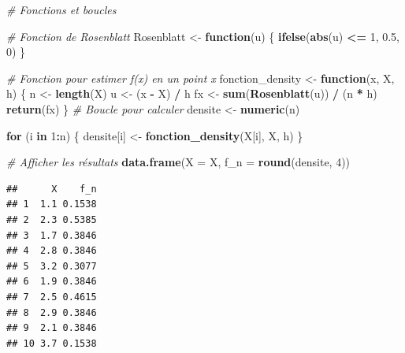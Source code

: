 \documentclass[
  12pt,
]{article}
\newenvironment{Shaded}{\begin{snugshade}}{\end{snugshade}}
\newcommand{\AttributeTok}[1]{\textcolor[rgb]{0.13,0.29,0.53}{#1}}
\newcommand{\CommentTok}[1]{\textcolor[rgb]{0.56,0.35,0.01}{\textit{#1}}}
\newcommand{\ControlFlowTok}[1]{\textcolor[rgb]{0.13,0.29,0.53}{\textbf{#1}}}
\newcommand{\DecValTok}[1]{\textcolor[rgb]{0.00,0.00,0.81}{#1}}
\newcommand{\FloatTok}[1]{\textcolor[rgb]{0.00,0.00,0.81}{#1}}
\newcommand{\FunctionTok}[1]{\textcolor[rgb]{0.13,0.29,0.53}{\textbf{#1}}}
\newcommand{\NormalTok}[1]{#1}
\newcommand{\OtherTok}[1]{\textcolor[rgb]{0.56,0.35,0.01}{#1}}
\newcommand{\SpecialCharTok}[1]{\textcolor[rgb]{0.81,0.36,0.00}{\textbf{#1}}}
\begin{document}
\begin{Shaded}
\begin{Highlighting}[]
\CommentTok{\# Fonctions et boucles}

\CommentTok{\# Fonction de Rosenblatt}
\NormalTok{Rosenblatt }\OtherTok{\textless{}{-}} \ControlFlowTok{function}\NormalTok{(u) \{}
  \FunctionTok{ifelse}\NormalTok{(}\FunctionTok{abs}\NormalTok{(u) }\SpecialCharTok{\textless{}=} \DecValTok{1}\NormalTok{, }\FloatTok{0.5}\NormalTok{, }\DecValTok{0}\NormalTok{)}
\NormalTok{\}}

\CommentTok{\# Fonction pour estimer f(x) en un point x}
\NormalTok{fonction\_density }\OtherTok{\textless{}{-}} \ControlFlowTok{function}\NormalTok{(x, X, h) \{}
\NormalTok{  n }\OtherTok{\textless{}{-}} \FunctionTok{length}\NormalTok{(X)}
\NormalTok{  u }\OtherTok{\textless{}{-}}\NormalTok{ (x }\SpecialCharTok{{-}}\NormalTok{ X) }\SpecialCharTok{/}\NormalTok{ h}
\NormalTok{  fx }\OtherTok{\textless{}{-}} \FunctionTok{sum}\NormalTok{(}\FunctionTok{Rosenblatt}\NormalTok{(u)) }\SpecialCharTok{/}\NormalTok{ (n }\SpecialCharTok{*}\NormalTok{ h)}
  \FunctionTok{return}\NormalTok{(fx)}
\NormalTok{\}}
\CommentTok{\# Boucle pour calculer }
\NormalTok{densite }\OtherTok{\textless{}{-}} \FunctionTok{numeric}\NormalTok{(n)  }

\ControlFlowTok{for}\NormalTok{ (i }\ControlFlowTok{in} \DecValTok{1}\SpecialCharTok{:}\NormalTok{n) \{}
\NormalTok{  densite[i] }\OtherTok{\textless{}{-}} \FunctionTok{fonction\_density}\NormalTok{(X[i], X, h)}
\NormalTok{\}}
\end{Highlighting}
\end{Shaded}

\begin{Shaded}
\begin{Highlighting}[]
\CommentTok{\# Afficher les résultats}
\FunctionTok{data.frame}\NormalTok{(}\AttributeTok{X =}\NormalTok{ X, }\AttributeTok{f\_n =} \FunctionTok{round}\NormalTok{(densite, }\DecValTok{4}\NormalTok{))}
\end{Highlighting}
\end{Shaded}

\begin{verbatim}
##      X    f_n
## 1  1.1 0.1538
## 2  2.3 0.5385
## 3  1.7 0.3846
## 4  2.8 0.3846
## 5  3.2 0.3077
## 6  1.9 0.3846
## 7  2.5 0.4615
## 8  2.9 0.3846
## 9  2.1 0.3846
## 10 3.7 0.1538
\end{verbatim}
\end{document}
